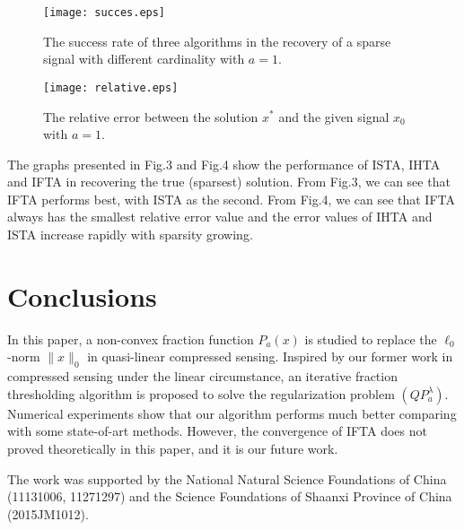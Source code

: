 \documentclass[smallextended]{svjour3}
\begin{document}
\begin{figure}[h!]
 \centering
 \texttt{[image: succes.eps]}
\caption{The success rate of three algorithms in the recovery of a sparse signal with different cardinality with $a=1$.}
\label{fig:3}       
\end{figure}

\begin{figure}[h!]
 \centering
 \texttt{[image: relative.eps]}
\caption{The relative error between the solution $x^{\ast}$ and the given signal $x_{0}$ with $a=1$.}
\label{fig:4}       
\end{figure}

The graphs presented in Fig.3 and Fig.4 show the performance of ISTA, IHTA and IFTA in recovering the true (sparsest) solution. From
Fig.3, we can see that IFTA performs best, with ISTA as the second. From Fig.4, we can see that IFTA always has the smallest relative
error value and the error values of IHTA and ISTA increase rapidly with sparsity growing.

\section{Conclusions}
In this paper, a non-convex fraction function $P_{a}(x)$ is studied to replace the $\ell_{0}$-norm $\|x\|_{0}$ in quasi-linear compressed sensing.
Inspired by our former work in compressed sensing under the linear circumstance, an iterative fraction thresholding algorithm is proposed to
solve the regularization problem $(QP_{a}^{\lambda})$. Numerical experiments show that our algorithm performs much better comparing with some
state-of-art methods. However, the convergence of IFTA does not proved theoretically in this paper, and it is our future work.

\begin{acknowledgements}
The work was supported by the National Natural Science Foundations of China (11131006, 11271297) and the Science
Foundations of Shaanxi Province of China (2015JM1012).
\end{acknowledgements}
\end{document}
